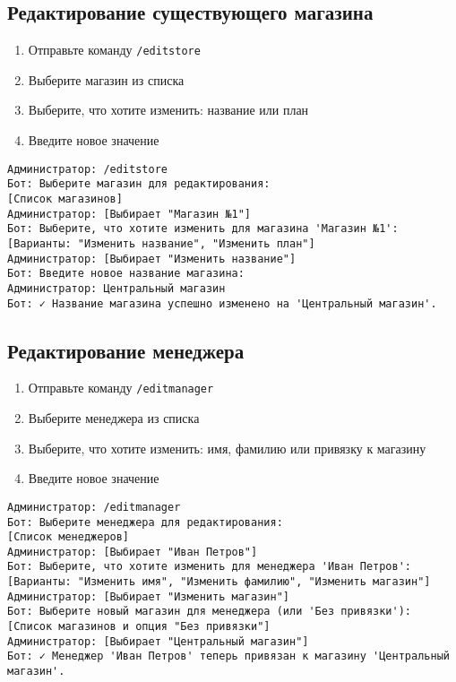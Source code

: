 \documentclass[a4paper,12pt]{article}
\begin{document}
\subsection{Редактирование существующего магазина}
\begin{enumerate}
    \item Отправьте команду \texttt{/editstore}
    \item Выберите магазин из списка
    \item Выберите, что хотите изменить: название или план
    \item Введите новое значение
\end{enumerate}

\begin{tcolorbox}[colback=green!5, title=Пример редактирования магазина]
\begin{verbatim}
Администратор: /editstore
Бот: Выберите магазин для редактирования:
[Список магазинов]
Администратор: [Выбирает "Магазин №1"]
Бот: Выберите, что хотите изменить для магазина 'Магазин №1':
[Варианты: "Изменить название", "Изменить план"]
Администратор: [Выбирает "Изменить название"]
Бот: Введите новое название магазина:
Администратор: Центральный магазин
Бот: ✓ Название магазина успешно изменено на 'Центральный магазин'.
\end{verbatim}
\end{tcolorbox}

\subsection{Редактирование менеджера}
\begin{enumerate}
    \item Отправьте команду \texttt{/editmanager}
    \item Выберите менеджера из списка
    \item Выберите, что хотите изменить: имя, фамилию или привязку к магазину
    \item Введите новое значение
\end{enumerate}

\begin{tcolorbox}[colback=green!5, title=Пример редактирования менеджера]
\begin{verbatim}
Администратор: /editmanager
Бот: Выберите менеджера для редактирования:
[Список менеджеров]
Администратор: [Выбирает "Иван Петров"]
Бот: Выберите, что хотите изменить для менеджера 'Иван Петров':
[Варианты: "Изменить имя", "Изменить фамилию", "Изменить магазин"]
Администратор: [Выбирает "Изменить магазин"]
Бот: Выберите новый магазин для менеджера (или 'Без привязки'):
[Список магазинов и опция "Без привязки"]
Администратор: [Выбирает "Центральный магазин"]
Бот: ✓ Менеджер 'Иван Петров' теперь привязан к магазину 'Центральный магазин'.
\end{verbatim}
\end{tcolorbox}
\end{document}
